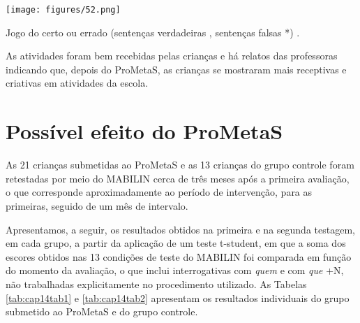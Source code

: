 \documentclass[output=paper,colorlinks,citecolor=brown,booklanguage=portuguese]{langscibook}
\begin{document}
\begin{Figura}
    \texttt{[image: figures/52.png]}
    \caption{Jogo do certo ou errado (sentenças verdadeiras \Checkmark, sentenças falsas *) .}
    \label{fig:cap14fig9}
\end{Figura}



As atividades foram bem recebidas pelas crianças e há relatos das professoras indicando que, depois do ProMetaS, as crianças se mostraram mais receptivas e criativas em atividades da escola. 


\section{Possível efeito do ProMetaS}
As 21 crianças submetidas ao ProMetaS e as 13 crianças do grupo controle foram retestadas por meio do MABILIN cerca de três meses após a primeira avaliação, o que corresponde aproximadamente ao período de intervenção, para as primeiras, seguido de um mês de intervalo. 

Apresentamos, a seguir, os resultados obtidos na primeira e na segunda testagem, em cada grupo, a partir da aplicação de um teste t-student, em que a soma dos escores obtidos nas 13 condições de teste do MABILIN foi comparada em função do momento da avaliação, o que inclui interrogativas com \emph{quem} e com \emph{que} +N, não trabalhadas explicitamente no procedimento utilizado. As Tabelas \ref{tab:cap14tab1} e \ref{tab:cap14tab2} apresentam os resultados individuais do grupo submetido ao ProMetaS e do grupo controle.
\end{document}
